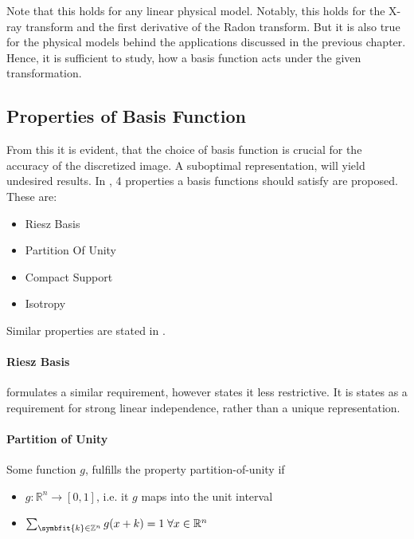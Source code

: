Note that this holds for any linear physical model. Notably, this holds for the X-ray transform and
the first derivative of the Radon transform. But it is also true for the physical models behind the
applications discussed in the previous chapter. Hence, it is sufficient to study, how a basis
function acts under the given transformation.

\subsection{Properties of Basis Function}


From this it is evident, that the choice of basis function is crucial for the accuracy of the
discretized image. A suboptimal representation, will yield undesired results. In
\cite{nilchian_optimized_2015}, 4 properties a basis functions should satisfy are proposed. These are:
\begin{itemize}
	\item Riesz Basis
	\item Partition Of Unity
	\item Compact Support
	\item Isotropy
\end{itemize}
Similar properties are stated in \cite{hanson_local_1985}.

\paragraph{Riesz Basis}

\cite{hanson_local_1985} formulates a similar requirement, however states it less restrictive. It is
states as a requirement for strong linear independence, rather than a unique representation.


\paragraph{Partition of Unity}

Some function \(g\), fulfills the property partition-of-unity if
\begin{itemize}
	\item \(g: \mathbb{R}^n \to [0, 1]\), i.e. it \(g\) maps into the unit interval
	\item \(\sum_{\symbfit{k} \in \mathbb{Z}^n} g(x + k) = 1 \; \forall x \in \mathbb{R}^n\)
\end{itemize}


